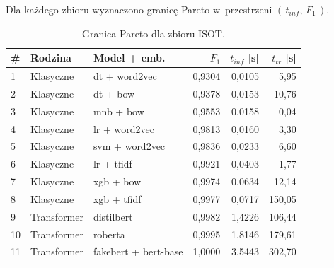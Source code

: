 \documentclass[oneside,polski,logo]{amuthesis}
\begin{document}
Dla każdego zbioru wyznaczono granicę Pareto w~przestrzeni
$(\,t_{inf},\,F_1\,)$.

\begin{table}[ht]
\centering
\caption{Granica Pareto dla zbioru ISOT.}
\label{tab:pareto_isot}
\begin{tabular}{lllrrr}
\toprule
\# & Rodzina & Model + emb. & $F_1$ & $t_{inf}$ [s] & $t_{tr}$ [s] \\
\midrule
1 & Klasyczne   & dt + word2vec          & 0,9304 & 0,0105 & 5,95   \\
2 & Klasyczne   & dt + bow               & 0,9378 & 0,0153 & 10,76  \\
3 & Klasyczne   & mnb + bow              & 0,9553 & 0,0158 & 0,04   \\
4 & Klasyczne   & lr + word2vec          & 0,9813 & 0,0160 & 3,30   \\
5 & Klasyczne   & svm + word2vec         & 0,9836 & 0,0233 & 6,60   \\
6 & Klasyczne   & lr + tfidf             & 0,9921 & 0,0403 & 1,77   \\
7 & Klasyczne   & xgb + bow              & 0,9974 & 0,0634 & 12,14  \\
8 & Klasyczne   & xgb + tfidf            & 0,9977 & 0,0717 & 150,05 \\
9 & Transformer   & distilbert             & 0,9982 & 1,4226 & 106,44 \\
10& Transformer   & roberta                & 0,9995 & 1,8146 & 179,61 \\
11& Transformer   & fakebert + bert-base   & 1,0000 & 3,5443 & 302,70 \\
\bottomrule
\end{tabular}
\end{table}
\end{document}
